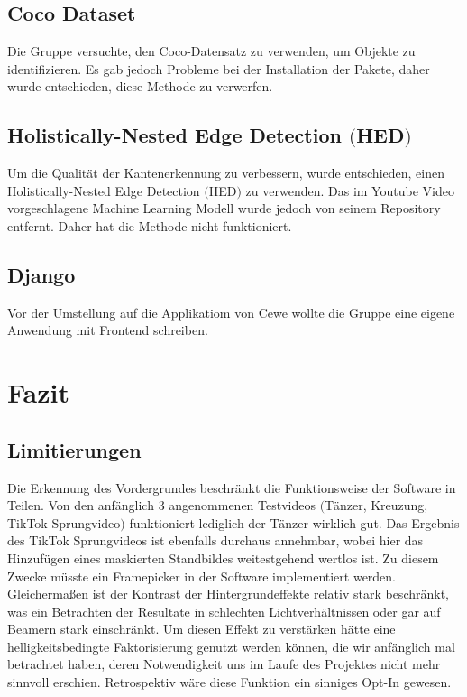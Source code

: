 \documentclass[12pt]{scrartcl}
\begin{document}
\subsection{Coco Dataset}
Die Gruppe versuchte, den Coco-Datensatz zu verwenden, um Objekte zu identifizieren. Es gab jedoch Probleme bei der Installation der Pakete, daher wurde entschieden, diese Methode zu verwerfen.
\subsection{Holistically-Nested Edge Detection $($HED$)$}
Um die Qualit\"at der Kantenerkennung zu verbessern, wurde entschieden, einen Holistically-Nested Edge Detection $($HED$)$ zu verwenden. Das im Youtube Video vorgeschlagene Machine Learning Modell wurde jedoch von seinem Repository entfernt. Daher hat die Methode nicht funktioniert.
\subsection{Django}
Vor der Umstellung auf die Applikatiom von Cewe wollte die Gruppe eine eigene Anwendung mit Frontend schreiben.




\section{Fazit}
\subsection{Limitierungen}
Die Erkennung des Vordergrundes beschr\"ankt die Funktionsweise der Software in Teilen. Von den anf\"anglich 3 angenommenen Testvideos
$ ( $T\"anzer, Kreuzung, TikTok Sprungvideo$ ) $ funktioniert lediglich der T\"anzer wirklich gut. Das Ergebnis des TikTok Sprungvideos ist
ebenfalls durchaus annehmbar, wobei hier das Hinzuf\"ugen eines maskierten Standbildes weitestgehend wertlos ist. Zu diesem Zwecke m\"usste ein Framepicker in der Software implementiert werden. Gleicherma{\ss}en ist der Kontrast der Hintergrundeffekte relativ stark beschr\"ankt, was ein Betrachten der Resultate in schlechten Lichtverh\"altnissen oder gar auf Beamern stark einschr\"ankt. Um diesen Effekt zu verst\"arken h\"atte eine helligkeitsbedingte Faktorisierung genutzt werden k\"onnen, die wir anf\"anglich mal betrachtet haben, deren Notwendigkeit uns im Laufe des Projektes nicht mehr sinnvoll erschien. Retrospektiv w\"are diese Funktion ein sinniges Opt-In gewesen.
\end{document}
